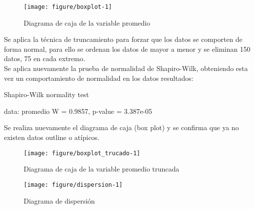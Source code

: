 \documentclass[conference]{IEEEtran}\usepackage[]{graphicx}\usepackage[]{color}
\makeatletter
\def\maxwidth{ %
  \ifdim\Gin@nat@width>\linewidth
    \linewidth
  \else
    \Gin@nat@width
  \fi
}
\makeatother
\begin{document}
\begin{itemize}
	\begin{figure}[ht]
		\centering

\texttt{[image: figure/boxplot-1]} 

		\caption{Diagrama de caja de la variable promedio}
		\label{fig:diagrama_boxplot_promedio}
	\end{figure}
	
	\bigskip

	Se aplica la técnica de truncamiento para forzar que los datos se comporten de forma normal, para ello se ordenan los datos de mayor a menor y se eliminan 150 datos, 75 en cada extremo. \\
	
	Se aplica nuevamente la prueba de normalidad de Shapiro-Wilk, obteniendo esta vez un comportamiento de normalidad en los datos resultados:\\
	
	\begin{center}

	Shapiro-Wilk normality test

data:  promedio
W = 0.9857, p-value = 3.387e-05


	\end{center}
	\bigskip	
	Se realiza nuevamente el diagrama de caja (box plot) y se confirma que ya no existen datos outline o atípicos.
	
	\begin{figure}[ht]
		\centering

\texttt{[image: figure/boxplot\_trucado-1]} 

		\caption{Diagrama de caja de la variable promedio truncada}
		\label{fig:diagrama_boxplot_promedio_truncada}
	\end{figure}
		
	\begin{figure}[ht]
		\centering

\texttt{[image: figure/dispersion-1]} 

		\caption{Diagrama de dispersión}
		\label{fig:diagrama_dispersion}
	\end{figure}
	

\end{itemize}
\end{document}
